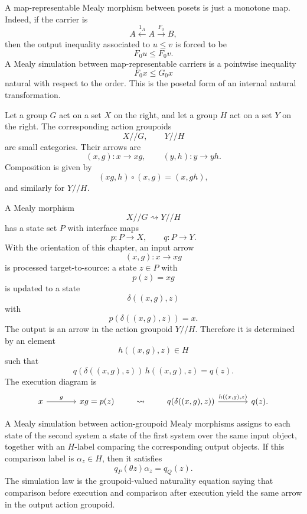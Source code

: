 \begin{example}
    A map-representable Mealy morphism between posets is just a monotone map. Indeed, if the carrier is
    \[
        A\xleftarrow{1_A}A\xrightarrow{F_0}B,
    \]
    then the output inequality associated to \(u\leq v\) is forced to be
    \[
        F_0u\leq F_0v.
    \]
    A Mealy simulation between map-representable carriers is a pointwise inequality
    \[
        F_0x\leq G_0x
    \]
    natural with respect to the order. This is the posetal form of an internal natural transformation.
\end{example}

\begin{example}
\label{example:action-groupoids} 
    Let a group \(G\) act on a set \(X\) on the right, and let a group \(H\)
    act on a set \(Y\) on the right. The corresponding action groupoids
    \[
        X/\!/G,
        \qquad
        Y/\!/H
    \]
    are small categories. Their arrows are
    \[
        (x,g):x\to xg,
        \qquad
        (y,h):y\to yh.
    \]
    Composition is given by
    \[
        (xg,h)\circ(x,g)=(x,gh),
    \]
    and similarly for \(Y/\!/H\).

    A Mealy morphism
    \[
        X/\!/G\rightsquigarrow Y/\!/H
    \]
    has a state set \(P\) with interface maps
    \[
        p:P\to X,
        \qquad
        q:P\to Y.
    \]
    With the orientation of this chapter, an input arrow
    \[
        (x,g):x\to xg
    \]
    is processed target-to-source: a state \(z\in P\) with
    \[
        p(z)=xg
    \]
    is updated to a state
    \[
        \delta((x,g),z)
    \]
    with
    \[
        p(\delta((x,g),z))=x.
    \]
    The output is an arrow in the action groupoid \(Y/\!/H\). Therefore it is
    determined by an element
    \[
        h((x,g),z)\in H
    \]
    such that
    \[
        q(\delta((x,g),z))\,h((x,g),z)=q(z).
    \]
    The execution diagram is
    \[
        \begin{tikzcd}[column sep=large]
            x
                \arrow[r, "{g}"]
            &
            xg=p(z)
        \end{tikzcd}
        \qquad\leadsto\qquad
        \begin{tikzcd}[column sep=large]
            q(\delta((x,g),z))
                \arrow[r, "{h((x,g),z)}"]
            &
            q(z).
        \end{tikzcd}
    \]

    A Mealy simulation between action-groupoid Mealy morphisms assigns to each
    state of the second system a state of the first system over the same input
    object, together with an \(H\)-label comparing the corresponding output
    objects. If this comparison label is \(\alpha_z\in H\), then it satisfies
    \[
        q_P(\theta z)\alpha_z=q_Q(z).
    \]
    The simulation law is the groupoid-valued naturality equation saying that
    comparison before execution and comparison after execution yield the same
    arrow in the output action groupoid.


\end{example}
